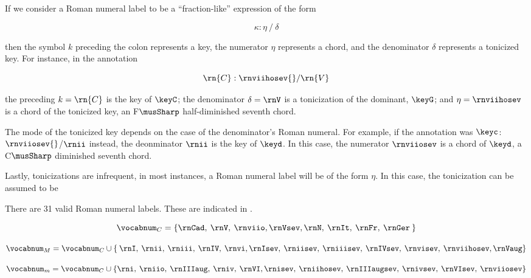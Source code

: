 
If we consider a Roman numeral label to be a
``fraction-like'' expression of the form

\begin{equation}
    \kappa : \eta \: / \: \delta
\end{equation}

then the symbol $k$ preceding the colon represents a key,
the numerator $\eta$ represents a chord, and the denominator
$\delta$ represents a tonicized key. For instance, in the
annotation 

\begin{equation}
    \rn{C}:\rnviihosev{}/\rn{V}
\end{equation}

the preceding $k=\rn{C}$ is the key of $\keyC$; the
denominator $\delta = \rnV$ is a tonicization of the
dominant, $\keyG$; and $\eta=\rnviihosev$ is a chord of the
tonicized key, an F$\musSharp$ half-diminished seventh
chord.

The mode of the tonicized key depends on the case of the
denominator's Roman numeral. For example, if the annotation
was $\keyc$:$\rnviiosev{}$/$\rnii$ instead, the deonminator
$\rnii$ is the key of $\keyd$. In this case, the numerator
$\rnviiosev$ is a chord of $\keyd$, a C$\musSharp$
diminished seventh chord.

Lastly, tonicizations are infrequent, in most instances, a
Roman numeral label will be of the form $\eta$. In this
case, the tonicization can be assumed to be 

There are 31 valid Roman numeral labels. These are indicated
in .



\begin{equation}
    \vocabnum_{C} = \{ \rnCad, \: \rnV, \: \rnviio,
    \rnVsev, \rnN, \: \rnIt, \: \rnFr, \: \rnGer \: \}
\end{equation}

\begin{equation}
    \vocabnum_{M} = \vocabnum_{C} \cup \{ \: \rnI, \: \rnii, \: 
    \rniii, \: \rnIV, \: \rnvi, \rnIsev, \: \rniisev, \: 
    \rniiisev, \: \rnIVsev, \: \rnvisev, \: \rnviihosev, \rnVaug \}
\end{equation}

\begin{equation}
    \vocabnum_{m} = \vocabnum_{C} \cup  \{ \rni, \: \rniio, \: 
    \rnIIIaug, \: \rniv, \: \rnVI, \rnisev, \: \rniihosev, \: 
    \rnIIIaugsev, \: \rnivsev, \: \rnVIsev, \: \rnviiosev \}
\end{equation}

